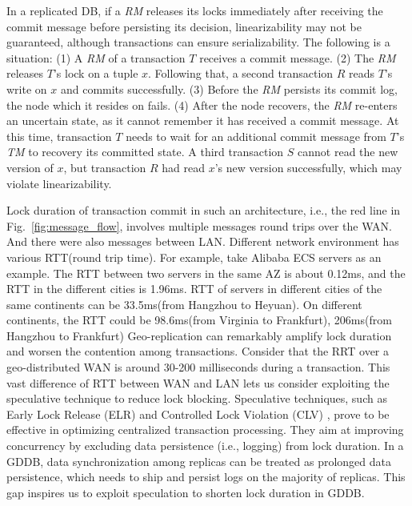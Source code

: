 \documentclass[conference]{IEEEtran}
\begin{document}
In a replicated DB, if a \emph{RM} releases its locks immediately after receiving the commit message before persisting its decision, linearizability may not be guaranteed, although transactions can ensure serializability.
The following is a situation:
(1) A \emph{RM} of a transaction ${T}$ receives a commit message.
(2) The \emph{RM} releases ${T}$'s lock on a tuple ${x}$. Following that,
a second transaction ${R}$ reads ${T}$'s write on ${x}$ and commits successfully.
(3) Before the \emph{RM} persists its commit log, the node which it resides on fails. 
(4) After the node recovers, the \emph{RM} re-enters an uncertain state, as it cannot remember it has received a commit message. At this time, transaction ${T}$ needs to wait for an additional commit message from ${T}$'s \emph{TM} to recovery its committed state.
A third transaction ${S}$ cannot read the new version of ${x}$,
but transaction ${R}$ had read ${x}$'s new version successfully, which may violate linearizability.

Lock duration of transaction commit in such an architecture, i.e., the red line in Fig.~\ref{fig:message_flow}, involves multiple messages round trips over the WAN.
And there were also messages between LAN.
Different network environment has various RTT(round trip time).
For example, take Alibaba ECS servers as an example.
The RTT between two servers in the same AZ is about 0.12ms, and the RTT in the different cities is 1.96ms.
RTT of servers in different cities of the same continents can be 33.5ms(from Hangzhou to Heyuan).
On different continents, the RTT could be 98.6ms(from Virginia to Frankfurt), 206ms(from Hangzhou to Frankfurt)
Geo-replication can remarkably amplify lock duration and worsen the contention among transactions.
Consider that the RRT over a geo-distributed WAN is around 30-200 milliseconds during a transaction. 
This vast difference of RTT between WAN and LAN lets us consider exploiting the speculative technique to reduce lock blocking.
Speculative techniques, such as Early Lock Release (ELR) \cite{EfficientLocking:conf/vldb/KimuraGK12} and Controlled Lock Violation (CLV)
\cite{CLV:conf/sigmod/GraefeLKTV13}, prove to be effective in optimizing centralized transaction processing.
They aim at improving concurrency by excluding data persistence (i.e., logging) from lock duration.
In a GDDB, data synchronization among replicas can be treated as prolonged data persistence, which needs to ship and persist logs on the majority of replicas.
This gap inspires us to exploit speculation to shorten lock duration in GDDB.
\end{document}
